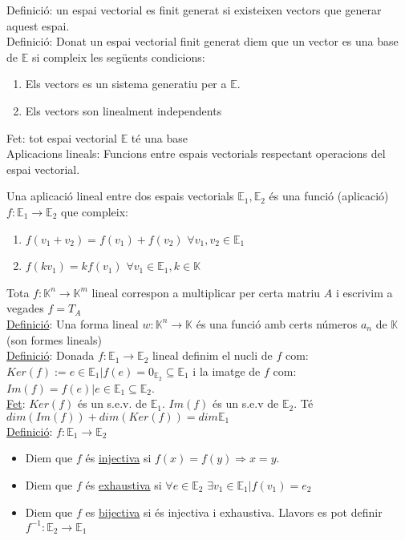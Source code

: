 \documentclass[../main.tex]{subfiles}
\begin{document}
    Definició: un espai vectorial es finit generat si existeixen vectors que generar aquest espai. \\
    Definició: Donat un espai vectorial finit generat diem que un vector es una base de $\mathbb{E}$ si compleix les següents condicions:
    \begin{enumerate}
        \item Els vectors es un sistema generatiu per a $\mathbb{E}$.
        \item Els vectors son linealment independents
    \end{enumerate}
    Fet: tot espai vectorial $\mathbb{E}$ té una base\\
    Aplicacions lineals: Funcions entre espais vectorials respectant operacions del espai vectorial. \\
    \begin{definicio}
        Una aplicació lineal entre dos espais vectorials $\mathbb{E}_1, \mathbb{E}_2$ és una funció (aplicació) $f: \mathbb{E}_1 \rightarrow \mathbb{E}_2$ que compleix:
        \begin{enumerate}
            \item $f(v_1 + v_2) = f(v_1) + f(v_2)$ $\forall v_1, v_2 \in \mathbb{E}_1$
            \item $f(k v_1) = k f(v_1)$ $\forall v_1 \in \mathbb{E}_1, k \in \mathbb{K}$
        \end{enumerate}
    \end{definicio}
    Tota $f: \mathbb{K}^n \rightarrow \mathbb{K}^m$ lineal correspon a multiplicar per certa matriu $A$ i escrivim a vegades $f = T_A$\\
    \underline{Definició}: Una forma lineal $w: \mathbb{K}^n \rightarrow \mathbb{K}$ és una funció amb certs números $a_n$ de $\mathbb{K}$ (son formes lineals)\\
    \underline{Definició}: Donada $f: \mathbb{E}_1 \rightarrow \mathbb{E}_2$ lineal definim el nucli de $f$ com: $Ker(f) := {e \in \mathbb{E}_1 | f(e) = 0_{\mathbb{E}_2}} \subseteq \mathbb{E}_1$ i la imatge de $f$ com: $Im(f) = {f(e) | e \in \mathbb{E}_1} \subseteq \mathbb{E}_2$.\\
    \underline{Fet}: $Ker(f)$ és un s.e.v. de $\mathbb{E}_1$. $Im(f)$ és un s.e.v de $\mathbb{E}_2$. Té $dim(Im(f)) + dim(Ker(f)) = dim \mathbb{E}_1$\\
    \underline{Definició}: $f: \mathbb{E}_1 \rightarrow \mathbb{E}_2$\\
    \begin{itemize}
        \item Diem que $f$ és \underline{injectiva} si $f(x) = f(y) \Rightarrow x = y$.
        \item Diem que $f$ és \underline{exhaustiva} si $\forall e \in \mathbb{E}_2$ $\exists v_1 \in \mathbb{E}_1| f(v_1) = e_2$
        \item Diem que $f$ es \underline{bijectiva} si és injectiva i exhaustiva. Llavors es pot definir $f^{-1}: \mathbb{E}_2 \rightarrow \mathbb{E}_1$
    \end{itemize}
\end{document}
